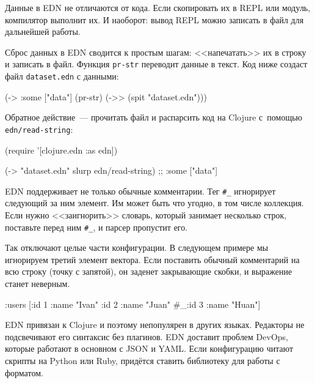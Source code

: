 \fi

Данные в EDN не отличаются от кода. Если скопировать их в REPL или модуль,
компилятор выполнит их. И наоборот: вывод REPL можно записать в файл для
дальнейшей работы.

Сброс данных в EDN сводится к простым шагам: <<напечатать>> их в строку и
записать в файл. Функция \verb|pr-str| переводит данные в текст. Код ниже
создаст файл \verb|dataset.edn| с данными:

\begin{english}
  \begin{clojure}
(-> {:some ["data"]}
    (pr-str)
    (->> (spit "dataset.edn")))
  \end{clojure}
\end{english}

Обратное действие~--- прочитать файл и распарсить код на Clojure с~помощью
\verb|edn/read-string|:

\begin{english}
  \begin{clojure}
(require '[clojure.edn :as edn])

(-> "dataset.edn" slurp edn/read-string)
;; {:some ["data"]}
  \end{clojure}
\end{english}


EDN поддерживает не только обычные комментарии. Тег \verb|#_| игнорирует
следующий за ним элемент. Им может быть что угодно, в том числе коллекция. Если
нужно <<заигнорить>> словарь, который занимает несколько строк, поставьте перед
ним \verb|#_|, и парсер пропустит его.


Так отключают целые части конфигурации. В следующем примере мы игнорируем третий
элемент вектора. Если поставить обычный комментарий на всю строку (точку с
запятой), он заденет закрывающие скобки, и выражение станет неверным.

\begin{english}
  \begin{clojure}
{:users [{:id 1 :name "Ivan"}
         {:id 2 :name "Juan"}
         #_{:id 3 :name "Huan"}]}
  \end{clojure}
\end{english}

EDN привязан к Clojure и поэтому непопулярен в других языках. Редакторы не
подсвечивают его синтаксис без плагинов. EDN доставит проблем DevOps, которые
работают в основном с JSON и YAML. Если конфигурацию читают скрипты на Python
или Ruby, придётся ставить библиотеку для работы с форматом.

